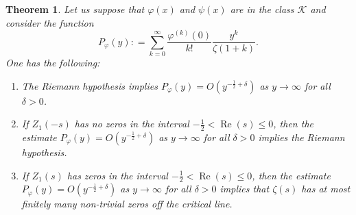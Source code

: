 \documentclass[11pt]{article}
\newtheorem{theorem}{Theorem}[section]
\newcommand{\real}{\operatorname{Re}}
\numberwithin{equation}{section}		 			%
\numberwithin{figure}{section}			 			%
\begin{document}
\begin{theorem}
Let us suppose that $\varphi(x)$ and $\psi(x)$ are in the class $\mathcal{K}$ and consider the function
\[{P_\varphi }(y): = \sum\limits_{k = 0}^\infty  {\frac{{{\varphi ^{(k)}}(0)}}{{k!}}\frac{{{y^k}}}{{\zeta (1 + k)}}} .\]
One has the following:
\begin{enumerate}
\item[\emph{i}] The Riemann hypothesis implies $P_\varphi(y) = O({y^{ - \tfrac{1}{2} + \delta }})$ as $y \to \infty$ for all $\delta >0$.
\item[\emph{ii.a}] If $Z_1(-s)$ has no zeros in the interval $-\tfrac{1}{2} < \real(s) \le 0$, then the estimate $P_\varphi(y) = O({y^{ - \tfrac{1}{2} + \delta }})$ as $y \to \infty$ for all $\delta >0$ implies the Riemann hypothesis.
\item[\emph{ii.b}] If $Z_1(s)$ has zeros in the interval $-\tfrac{1}{2} < \real(s) \le 0$, then the estimate $P_\varphi(y) = O({y^{ - \tfrac{1}{2} + \delta }})$ as $y \to \infty$ for all $\delta >0$ implies that $\zeta(s)$ has at most finitely many non-trivial zeros off the critical line.
\end{enumerate}
\end{theorem}
\end{document}
